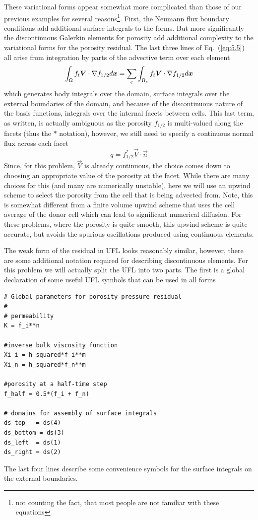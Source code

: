 These variational forms appear somewhat more complicated than those of
our previous examples for several reasons\footnote{not counting the fact, that
most people are not familiar with these equations}.  First,  the
Neumann flux boundary conditions add additional surface integrals to
the forms.  But more significantly the discontinuous Galerkin elements
for porosity add additional complexity to the variational forms for
the porosity residual.  The last three lines of Eq.\ (\ref{eq:5.5}) all arise from
integration by parts of the advective term over each element
\begin{displaymath}
  \int_{\Omega} f_{t}{\mbox{\boldmath$V$}}\cdot\nabla f_{1/2} d{\mbox{\boldmath$x$}} = \sum_e \int_{\Omega_{e}} f_{t}{\mbox{\boldmath$V$}}\cdot\nabla f_{1/2} d{\mbox{\boldmath$x$}}
\end{displaymath}
which generates body integrals over the domain,  surface integrals
over the external boundaries of the domain,  and because of the
discontinuous nature of the basis functions,  integrals over the
internal facets between cells.  This last term, as written, is
actually ambiguous as the porosity
$f_{1/2}$ is  multi-valued along the facets (thus the $*$ notation),
however, we still need to specify a continuous normal flux across each
facet 
\begin{equation}
  \label{eq5:flux}
    q = f_{1/2}^{*}\vec{V}\cdot\vec{n}
\end{equation}
Since, for this problem, $\vec{V}$ is already continuous, the choice
comes down to choosing an appropriate value of the porosity at the
facet. While there are many choices for this (and many are numerically
unstable), here we  will use an upwind scheme to select the
porosity from the cell that is being advected from.  Note, this is
somewhat different from a finite volume upwind scheme that uses the
cell average of the donor cell which can lead to significant numerical
diffusion.  For these problems, where the porosity is quite smooth,
this upwind scheme is quite accurate, but avoids the spurious
oscillations produced using continuous elements.

The weak form of the residual in UFL looks reasonably
similar, however, there are some additional notation required for
describing discontinuous elements.  For this problem we will actually
split the UFL into two parts.  The first is a global declaration of
some useful UFL symbols that can be used in all forms
\begin{lstlisting}[style=UFL]
# Global parameters for porosity pressure residual 
#
# permeability
K = f_i**n

#inverse bulk viscosity function
Xi_i = h_squared*f_i**m
Xi_n = h_squared*f_n**m

#porosity at a half-time step
f_half = 0.5*(f_i + f_n)

# domains for assembly of surface integrals
ds_top   = ds(4)
ds_bottom = ds(3)
ds_left  = ds(1)
ds_right = ds(2)
\end{lstlisting}
The last four lines describe some convenience symbols for the
surface integrals on the external boundaries. 

